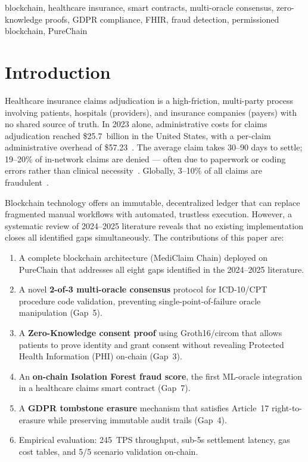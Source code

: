 \documentclass[journal]{IEEEtran}
\begin{document}
\begin{IEEEkeywords}
blockchain, healthcare insurance, smart contracts, multi-oracle consensus,
zero-knowledge proofs, GDPR compliance, FHIR, fraud detection,
permissioned blockchain, PureChain
\end{IEEEkeywords}

\section{Introduction}
\label{sec:intro}

Healthcare insurance claims adjudication is a high-friction, multi-party
process involving patients, hospitals (providers), and insurance companies
(payers) with no shared source of truth. In 2023 alone, administrative costs
for claims adjudication reached \$25.7~billion in the United States, with a
per-claim administrative overhead of \$57.23~\cite{lit:arxiv2407}.
The average claim takes 30--90 days to settle; 19--20\% of in-network claims
are denied — often due to paperwork or coding errors rather than clinical
necessity~\cite{lit:springer2025}. Globally, 3--10\% of all claims are
fraudulent~\cite{lit:pmc12650700}.

Blockchain technology offers an immutable, decentralized ledger that can
replace fragmented manual workflows with automated, trustless execution.
However, a systematic review of 2024--2025 literature reveals that no existing
implementation closes all identified gaps simultaneously. The contributions of
this paper are:

\begin{enumerate}
  \item A complete blockchain architecture (MediClaim Chain) deployed on
        PureChain that addresses all eight gaps identified in the 2024--2025
        literature.
  \item A novel \textbf{2-of-3 multi-oracle consensus} protocol for ICD-10/CPT
        procedure code validation, preventing single-point-of-failure oracle
        manipulation (Gap~5).
  \item A \textbf{Zero-Knowledge consent proof} using Groth16/circom that
        allows patients to prove identity and grant consent without revealing
        Protected Health Information (PHI) on-chain (Gap~3).
  \item An \textbf{on-chain Isolation Forest fraud score}, the first ML-oracle
        integration in a healthcare claims smart contract (Gap~7).
  \item A \textbf{GDPR tombstone erasure} mechanism that satisfies
        Article~17 right-to-erasure while preserving immutable audit trails (Gap~4).
  \item Empirical evaluation: 245~TPS throughput, sub-5s settlement latency,
        gas cost tables, and 5/5 scenario validation on-chain.
\end{enumerate}
\end{document}
